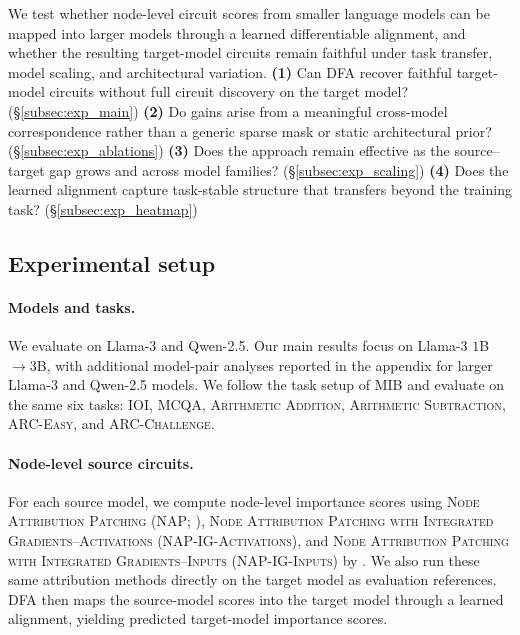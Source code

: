 \documentclass{article} %
\begin{document}
We test whether node-level circuit scores from smaller language models can be mapped into larger models through a learned differentiable alignment, and whether the resulting target-model circuits remain faithful under task transfer, model scaling, and architectural variation.
\textbf{(1)} Can DFA recover faithful target-model circuits without full circuit discovery on the target model? (\S\ref{subsec:exp_main})
\textbf{(2)} Do gains arise from a meaningful cross-model correspondence rather than a generic sparse mask or static architectural prior? (\S\ref{subsec:exp_ablations})
\textbf{(3)} Does the approach remain effective as the source--target gap grows and across model families? (\S\ref{subsec:exp_scaling})
\textbf{(4)} Does the learned alignment capture task-stable structure that transfers beyond the training task? (\S\ref{subsec:exp_heatmap})


\subsection{Experimental setup}
\label{subsec:exp_setup}
\label{section:setup}

\paragraph{Models and tasks.}


We evaluate on Llama-3 and Qwen-2.5. Our main results focus on Llama-3 $1$B$\rightarrow3$B, with additional model-pair analyses reported in the appendix for larger Llama-3 and Qwen-2.5 models. We follow the task setup of MIB \citep{mib-2025}and evaluate on the same six tasks: \textsc{IOI}, \textsc{MCQA}, \textsc{Arithmetic Addition}, \textsc{Arithmetic Subtraction}, \textsc{ARC-Easy}, and \textsc{ARC-Challenge}. 

\paragraph{Node-level source circuits.}






For each source model, we compute node-level importance scores using \textsc{Node Attribution Patching} (\textsc{NAP}; \citealt{nanda2023attribution, syed-etal-2024-attribution}), \textsc{Node Attribution Patching with Integrated Gradients--Activations} (\textsc{NAP-IG-Activations}), and \textsc{Node Attribution Patching with Integrated Gradients--Inputs} (\textsc{NAP-IG-Inputs}) by \cite{hanna2024eapig, marks2024saecircuits}. We also run these same attribution methods directly on the target model as evaluation references. DFA then maps the source-model scores into the target model through a learned alignment, yielding predicted target-model importance scores. 
\end{document}
